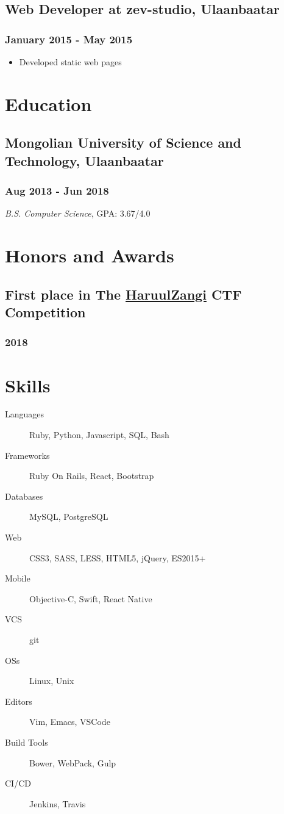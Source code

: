 \documentclass[letterpaper]{article}
\begin{document}
\subsection{Web Developer at zev-studio, Ulaanbaatar}
\label{sec:org0133852}
\subsubsection{January 2015 - May 2015}
\label{sec:org8e68d7d}
\begin{itemize}
\item Developed static web pages
\end{itemize}
\section{Education}
\label{sec:org0dd1f7b}
\subsection{Mongolian University of Science and Technology, Ulaanbaatar}
\label{sec:org16d81e8}
\subsubsection{Aug 2013 - Jun 2018}
\label{sec:org0a38d83}
\emph{B.S. Computer Science}, GPA: 3.67/4.0
\section{Honors and Awards}
\label{sec:org1c9fbdd}
\subsection{First place in The \href{http:www.haruulzangi.mn}{HaruulZangi} CTF Competition}
\label{sec:orge5a0ea3}
\subsubsection{2018}
\label{sec:org17c81de}
\section{Skills}
\label{sec:org24f6acc}
\begin{description}
\item[{Languages}] Ruby, Python, Javascript, SQL, Bash
\item[{Frameworks}] Ruby On Rails, React, Bootstrap
\item[{Databases}] MySQL, PostgreSQL
\item[{Web}] CSS3, SASS, LESS, HTML5, jQuery, ES2015+
\item[{Mobile}] Objective-C, Swift, React Native
\item[{VCS}] git
\item[{OSs}] Linux, Unix
\item[{Editors}] Vim, Emacs, VSCode
\item[{Build Tools}] Bower, WebPack, Gulp
\item[{CI/CD}] Jenkins, Travis
\end{description}
\end{document}
